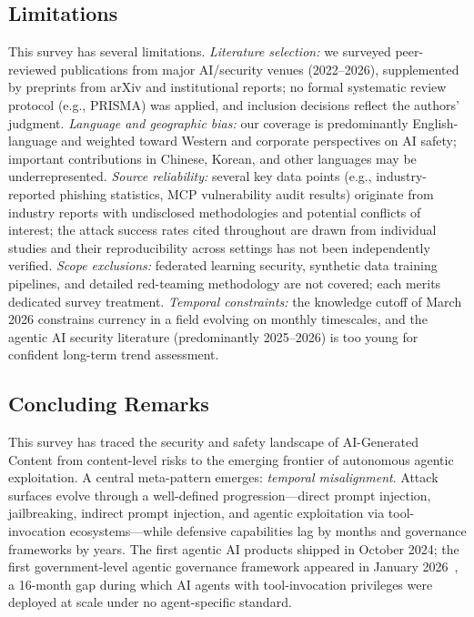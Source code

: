 \subsection{Limitations}
\label{sec:limitations}

This survey has several limitations. \emph{Literature selection:} we surveyed peer-reviewed publications from major AI/security venues (2022--2026), supplemented by preprints from arXiv and institutional reports; no formal systematic review protocol (e.g., PRISMA) was applied, and inclusion decisions reflect the authors' judgment. \emph{Language and geographic bias:} our coverage is predominantly English-language and weighted toward Western and corporate perspectives on AI safety; important contributions in Chinese, Korean, and other languages may be underrepresented. \emph{Source reliability:} several key data points (e.g., industry-reported phishing statistics, MCP vulnerability audit results) originate from industry reports with undisclosed methodologies and potential conflicts of interest; the attack success rates cited throughout are drawn from individual studies and their reproducibility across settings has not been independently verified. \emph{Scope exclusions:} federated learning security, synthetic data training pipelines, and detailed red-teaming methodology are not covered; each merits dedicated survey treatment. \emph{Temporal constraints:} the knowledge cutoff of March 2026 constrains currency in a field evolving on monthly timescales, and the agentic AI security literature (predominantly 2025--2026) is too young for confident long-term trend assessment.


\subsection{Concluding Remarks}
\label{sec:conclusions}

This survey has traced the security and safety landscape of AI-Generated Content from content-level risks to the emerging frontier of autonomous agentic exploitation. A central meta-pattern emerges: \emph{temporal misalignment}. Attack surfaces evolve through a well-defined progression---direct prompt injection, jailbreaking, indirect prompt injection, and agentic exploitation via tool-invocation ecosystems---while defensive capabilities lag by months and governance frameworks by years. The first agentic AI products shipped in October 2024; the first government-level agentic governance framework appeared in January 2026~\cite{imda2026agentic}, a 16-month gap during which AI agents with tool-invocation privileges were deployed at scale under no agent-specific standard.

